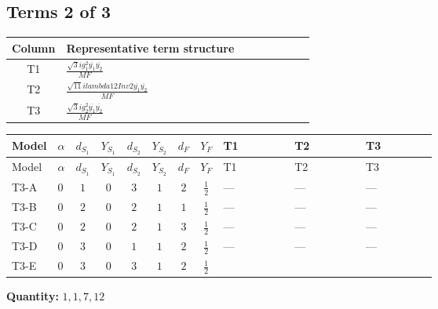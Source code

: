 \documentclass[8pt]{article}
\begin{document}
\begin{landscape}
\subsection*{Terms 2 of 3}
\begin{center}
\begin{tabular}{@{}c >{\raggedright\arraybackslash}p{0.82\linewidth}@{}}
\toprule
Column & Representative term structure \\
\midrule
T1 & \(\displaystyle \frac{\sqrt{3} i g_{1}^{2} \overline{y_{1}} \overline{y_{2}}}{MF}\) \\
\midrule
T2 & \(\displaystyle \frac{\sqrt{11} i lambda12Inv2 \overline{y_{1}} \overline{y_{2}}}{MF}\) \\
\midrule
T3 & \(\displaystyle \frac{\sqrt{3} i g_{2}^{2} \overline{y_{1}} \overline{y_{2}}}{MF}\) \\
\midrule
\bottomrule
\end{tabular}
\end{center}
\smallskip
\tiny
\begin{longtable}{@{}llcccccc >{\raggedright\arraybackslash}p{0.21\linewidth} >{\raggedright\arraybackslash}p{0.21\linewidth} >{\raggedright\arraybackslash}p{0.21\linewidth}@{}}
\toprule
Model & $\alpha$ & $d_{S_1}$ & $Y_{S_1}$ & $d_{S_2}$ & $Y_{S_2}$ & $d_F$ & $Y_F$ & T1 & T2 & T3 \\
\midrule
\endfirsthead
\toprule
Model & $\alpha$ & $d_{S_1}$ & $Y_{S_1}$ & $d_{S_2}$ & $Y_{S_2}$ & $d_F$ & $Y_F$ & T1 & T2 & T3 \\
\midrule
\endhead
T3-A & $0$ & $1$ & $0$ & $3$ & $1$ & $2$ & $\frac{1}{2}$ & --- & --- & --- \\
\midrule
T3-B & $0$ & $2$ & $0$ & $2$ & $1$ & $1$ & $\frac{1}{2}$ & --- & --- & --- \\
\midrule
T3-C & $0$ & $2$ & $0$ & $2$ & $1$ & $3$ & $\frac{1}{2}$ & --- & --- & --- \\
\midrule
T3-D & $0$ & $3$ & $0$ & $1$ & $1$ & $2$ & $\frac{1}{2}$ & --- & --- & --- \\
\midrule
T3-E & $0$ & $3$ & $0$ & $3$ & $1$ & $2$ & $\frac{1}{2}$ & \scriptsize\adjustbox{max width=\linewidth}{$\begin{gathered} \frac{\sqrt{3} i g_{1}^{2} \overline{y_{1}} \overline{y_{2}}}{8 MF}\end{gathered}$} & \scriptsize\adjustbox{max width=\linewidth}{$\begin{gathered} \frac{3 \sqrt{11} i lambda12Inv2 \overline{y_{1}} \overline{y_{2}}}{22 MF}\end{gathered}$} & \scriptsize\adjustbox{max width=\linewidth}{$\begin{gathered} \frac{49 \sqrt{3} i g_{2}^{2} \overline{y_{1}} \overline{y_{2}}}{24 MF}\end{gathered}$} \\
\midrule
\bottomrule
\end{longtable}
\clearpage
\noindent\textbf{Quantity: }$\mathrm{1,1,7,12}$\par\smallskip

\end{landscape}
\end{document}
